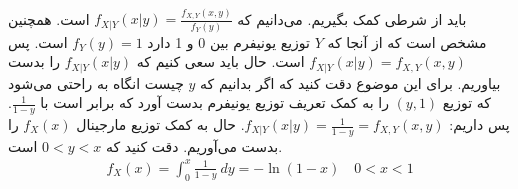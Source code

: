 \\
باید از
شرطی کمک بگیریم. می‌دانیم که
$f_{X|Y}(x|y) = \frac{f_{X,Y}(x,y)}{f_Y(y)}$
است. همچنین مشخص است که از آنجا که
$Y$
توزیع یونیفرم بین 0 و 1 دارد
$f_Y(y) = 1$
است. پس
$f_{X|Y}(x|y) = f_{X,Y}(x,y)$
است. حال باید سعی کنیم که
$f_{X|Y}(x|y)$
را بدست بیاوریم. برای این موضوع دقت کنید که اگر بدانیم که
$y$
چیست انگاه به راحتی می‌شود که
توزیع
$(y, 1)$
را به کمک تعریف توزیع یونیفرم بدست آورد که برابر است با
$\frac{1}{1 - y}$.
پس داریم:
$f_{X|Y}(x|y) = \frac{1}{1 - y} = f_{X,Y}(x,y)$.
حال به کمک توزیع مارجینال
$f_X(x)$
را بدست می‌آوریم. دقت کنید که
$0 < y < x$
است.
\begin{gather*}
    f_X(x) = \int_0^x \frac{1}{1 - y} ~ dy = - \ln(1 - x) \quad 0 < x < 1
\end{gather*}